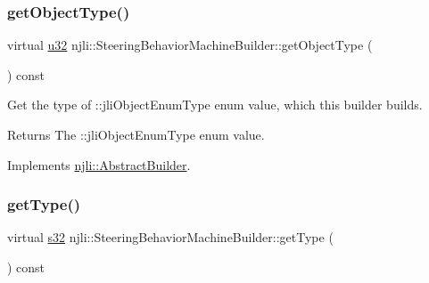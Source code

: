 \mbox{\label{classnjli_1_1_steering_behavior_machine_builder_a9a321d9d64bc49d4a63322819773c9bc}} 
\subsubsection{\texorpdfstring{get\+Object\+Type()}{getObjectType()}}
{\footnotesize\ttfamily virtual \mbox{\hyperlink{_util_8h_a10e94b422ef0c20dcdec20d31a1f5049}{u32}} njli\+::\+Steering\+Behavior\+Machine\+Builder\+::get\+Object\+Type (\begin{DoxyParamCaption}{ }\end{DoxyParamCaption}) const\hspace{0.3cm}{\ttfamily [virtual]}}

Get the type of \+::jli\+Object\+Enum\+Type enum value, which this builder builds.

\begin{DoxyReturn}{Returns}
The \+::jli\+Object\+Enum\+Type enum value. 
\end{DoxyReturn}


Implements \mbox{\hyperlink{classnjli_1_1_abstract_builder_a0f2d344fcf697b167f4f2b1122b5fb33}{njli\+::\+Abstract\+Builder}}.

\mbox{\label{classnjli_1_1_steering_behavior_machine_builder_a0cd739ed2ab0de74addadc632a0184fe}} 
\subsubsection{\texorpdfstring{get\+Type()}{getType()}}
{\footnotesize\ttfamily virtual \mbox{\hyperlink{_util_8h_aa62c75d314a0d1f37f79c4b73b2292e2}{s32}} njli\+::\+Steering\+Behavior\+Machine\+Builder\+::get\+Type (\begin{DoxyParamCaption}{ }\end{DoxyParamCaption}) const\hspace{0.3cm}{\ttfamily [virtual]}}

